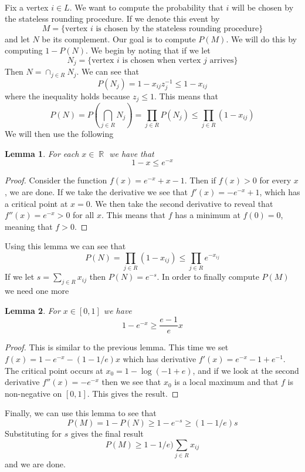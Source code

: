 \documentclass{article}
\DeclareMathOperator{\R}{\mathbb{R}}
\newcommand{\problem}[1]{\noindent {\bf #1}}
\newcommand{\problempart}[1]{\noindent{\textbf{(#1)}}}
\newtheorem*{lem}{Lemma}
\begin{document}
\problem{Problem 4.} \\
\problempart{a} Fix a vertex $i \in L$. We want to compute the probability that $i$ will be chosen by the stateless rounding procedure. If we denote this event by 
\[
M = \{\text{vertex } i \text{ is chosen by the stateless rounding procedure}\}
\]
and let $N$ be its complement. Our goal is to compute $P(M)$. We will do this by computing $1 - P(N)$. We begin by noting that if we let 
\[
N_j = \{\text{vertex } i \text{ is chosen when vertex } j \text{ arrives}\}
\]
Then $N = \cap_{j \in R} N_j$. We can see that
\[
P(N_j) = 1 - x_{ij}z_j^{-1} \leq 1 - x_{ij}
\]
where the inequality holds because $z_j \leq 1$. This means that 
\[
P(N) = P(\bigcap_{j\in R} N_j) = \prod_{j\in R} P(N_j) \leq \prod_{j\in R} (1 - x_{ij}) 
\]
We will then use the following \\
\begin{lem}
For each $x \in \R$ we have that 
\[
1-x \leq e^{-x}
\]
\end{lem}
\begin{proof}
Consider the function $f(x) = e^{-x} + x - 1$. Then if $f(x) > 0$ for every $x$, we are done. If we take the derivative we see that $f'(x) = -e^{-x} + 1$, which has a critical point at $x = 0$. We then take the second derivative to reveal that $f''(x) = e^{-x} > 0$ for all $x$. This means that $f$ has a minimum at $f(0) = 0$, meaning that $f > 0$.  
\end{proof}
Using this lemma we can see that
\[
P(N) = \prod_{j\in R} (1 - x_{ij})  \leq \prod_{j\in R} e^{-x_{ij}}
\]
If we let $s = \sum_{j\in R}x_{ij}$ then $P(N) = e^{-s}$. In order to finally compute $P(M)$ we need one more \\
\begin{lem}
For $x \in [0, 1]$ we have 
\[
1 - e^{-x} \geq \frac{e-1}{e}x
\]
\end{lem}
\begin{proof}
This is similar to the previous lemma. This time we set $f(x) = 1 - e^{-x} - (1-1/e)x$ which has derivative $f'(x) = e^{-x} - 1 + e^{-1}$. The critical point occurs at $x_0 = 1 - \log(-1 + e)$, and if we look at the second derivative $f''(x) = -e^{-x}$ then we see that $x_0$ is a local maximum and that $f$ is non-negative on $[0,1]$. This gives the result.
\end{proof}
Finally, we can use this lemma to see that
\[
P(M) = 1 - P(N) \geq 1 - e^{-s} \geq (1 - 1/e)s 
\]
Substituting for $s$ gives the final result
\[
P(M) \geq 1 - 1/e)\sum_{j\in R} x_{ij}
\]
and we are done.

\problempart{b} 
\end{document}
